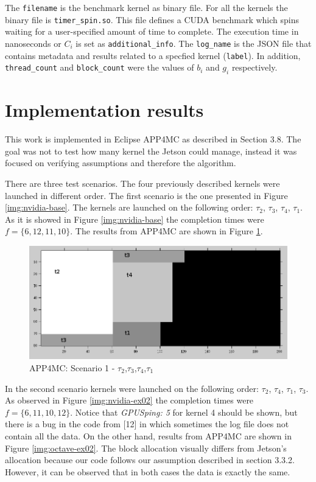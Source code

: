 \documentclass[
  12pt,
  a4paperpaper,
]{report}
\begin{document}
The \texttt{filename} is the benchmark kernel as binary file.
For all the kernels the binary file is \texttt{timer\_spin.so}. This file defines a
CUDA benchmark which spins waiting for a user-specified
amount of time to complete. The execution time in nanoseconds or \(C_i\)
is set as \texttt{additional\_info}. The \texttt{log\_name} is the
JSON file that contains metadata and results related to a specfied
kernel (\texttt{label}). In addition, \texttt{thread\_count} and
\texttt{block\_count} were the values of \(b_i\) and \(g_i\)
respectively.

\hypertarget{implementation-results}{%
\section{Implementation results}\label{implementation-results}}

This work is implemented in  Eclipse APP4MC as described in Section 3.8. The goal was not to test
how many kernel the Jetson could manage, instead it was focused on verifying
assumptions and therefore the algorithm.

There are  three test scenarios. The four previously described kernels
were launched in different order. The first scenario is the one
presented in Figure \ref{img:nvidia-base}. The kernels are launched on
the following order: \(\tau_2\), \(\tau_3\), \(\tau_4\), \(\tau_1\). As it is showed in Figure
\ref{img:nvidia-base} the completion times were \(f = \{6, 12,11,10\}\).
The results from APP4MC are shown in Figure \ref{img:octave-base}.

\begin{figure}
\centering
\includegraphics[width=1\textwidth,height=\textheight]{source/figures/octave/base.png}
\caption{APP4MC: Scenario 1 - \(\tau_2\),\(\tau_3\),\(\tau_4\),\(\tau_1\) \label{img:octave-base}}
\end{figure}

In the second scenario kernels were launched on the following order: \(\tau_2\),
\(\tau_4\), \(\tau_1\), \(\tau_3\). As observed in Figure \ref{img:nvidia-ex02} the completion
times were \(f = \{6,11,10,12\}\). Notice that \emph{GPUSping: 5} for
kernel 4 should be shown, but there is a bug in the code from {[}12{]}
in which sometimes the log file does not contain all the data. On the
other hand, results from APP4MC are shown in Figure
\ref{img:octave-ex02}. The block allocation visually differs from Jetson's
allocation because our code follows our assumption described in section
3.3.2. However, it can be observed that in both cases the data is exactly the same.  
\end{document}

